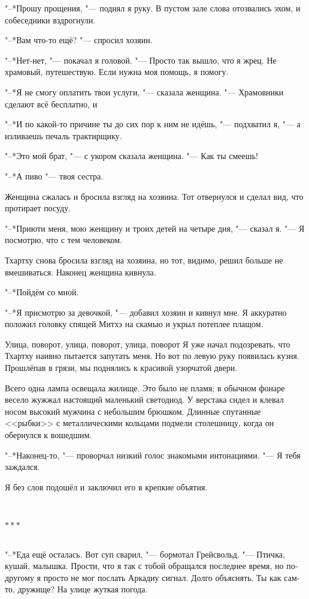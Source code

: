 \documentclass[a4paper,10pt,fleqn]{book}
\newcommand{\ldotst}{\so{...}\xspace}
\newcommand{\razd}{~\\{\centering\Large\bfseries$\ast \ast \ast$\par}~\\}
\begin{document}
"--*Прошу прощения, "--- поднял я руку.
В пустом зале слова отозвались эхом, и собеседники вздрогнули.

"--*Вам что-то ещё? "--- спросил хозяин.

"--*Нет-нет, "--- покачал я головой.
"--- Просто так вышло, что я жрец.
Не храмовый, путешествую.
Если нужна моя помощь, я помогу.

"--*Я не смогу оплатить твои услуги, "--- сказала женщина.
"--- Храмовники сделают всё бесплатно, и\ldotst

"--*И по какой-то причине ты до сих пор к ним не идёшь, "--- подхватил я, "--- а изливаешь печаль трактирщику.

"--*Это мой брат, "--- с укором сказала женщина.
"--- Как ты смеешь!

"--*А пиво "--- твоя сестра.

Женщина сжалась и бросила взгляд на хозяина.
Тот отвернулся и сделал вид, что протирает посуду.

"--*Приюти меня, мою женщину и троих детей на четыре дня, "--- сказал я.
"--- Я посмотрю, что с тем человеком.

Тхартху снова бросила взгляд на хозяина, но тот, видимо, решил больше не вмешиваться.
Наконец женщина кивнула.

"--*Пойдём со мной.

"--*Я присмотрю за девочкой, "--- добавил хозяин и кивнул мне.
Я аккуратно положил головку спящей Митхэ на скамью и укрыл потеплее плащом.

Улица, поворот, улица, поворот, улица, поворот\ldotst
Я уже начал подозревать, что Тхартху наивно пытается запутать меня.
Но вот по левую руку появилась кузня.
Прошлёпав в грязи, мы поднялись к красивой узорчатой двери.

Всего одна лампа освещала жилище.
Это было не пламя;
в обычном фонаре весело жужжал настоящий маленький светодиод.
У верстака сидел и клевал носом высокий мужчина с небольшим брюшком.
Длинные спутанные <<рыбки>> с металлическими кольцами подмели столешницу, когда он обернулся к вошедшим.

"--*Наконец-то, "--- проворчал низкий голос знакомыми интонациями.
"--- Я тебя заждался.

Я без слов подошёл и заключил его в крепкие объятия.

\razd

"--*Еда ещё осталась.
Вот суп сварил, "--- бормотал Грейсвольд.
"--- Птичка, кушай, малышка.
Прости, что я так с тобой обращался последнее время, но по-другому я просто не мог послать Аркадиу сигнал.
Долго объяснять.
Ты как сам-то, дружище?
На улице жуткая погода.
\end{document}
